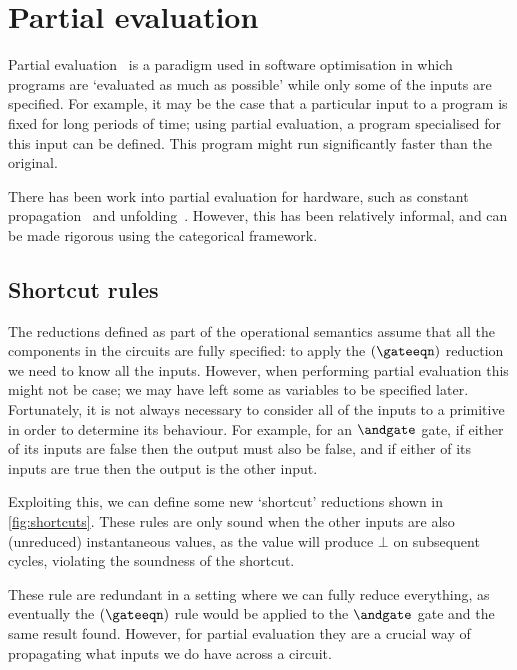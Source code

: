 \section{Partial evaluation}

Partial evaluation~\cite{jones1996introduction} is a paradigm used in software
optimisation in which programs are `evaluated as much as possible' while only
some of the inputs are specified.
For example, it may be the case that a particular input to a program is fixed
for long periods of time; using partial evaluation, a program specialised for
this input can be defined.
This program might run significantly faster than the original.

There has been work into partial evaluation for hardware, such as constant
propagation~\cite{singh1996expressing,singh1999partial} and
unfolding~\cite{thompson2006bitlevel}.
However, this has been relatively informal, and can be made rigorous using the
categorical framework.

\subsection{Shortcut rules}

The reductions defined as part of the operational semantics assume that all the
components in the circuits are fully specified: to apply the \((\gateeqn)\)
reduction we need to know all the inputs.
However, when performing partial evaluation this might not be case; we may have
left some as variables to be specified later.
Fortunately, it is not always necessary to consider all of the inputs to a
primitive in order to determine its behaviour.
For example, for an \(\andgate\) gate, if either of its inputs are false then
the output must also be false, and if either of its inputs are true then the
output is the other input.

Exploiting this, we can define some new `shortcut' reductions shown in
\cref{fig:shortcuts}.
These rules are only sound when the other inputs are also (unreduced)
instantaneous values, as the value will produce \(\bot\) on subsequent cycles,
violating the soundness of the shortcut.

These rule are redundant in a setting where we can fully reduce everything, as
eventually the \((\gateeqn)\) rule would be applied to the \(\andgate\) gate and
the same result found.
However, for partial evaluation they are a crucial way of propagating what
inputs we do have across a circuit.



